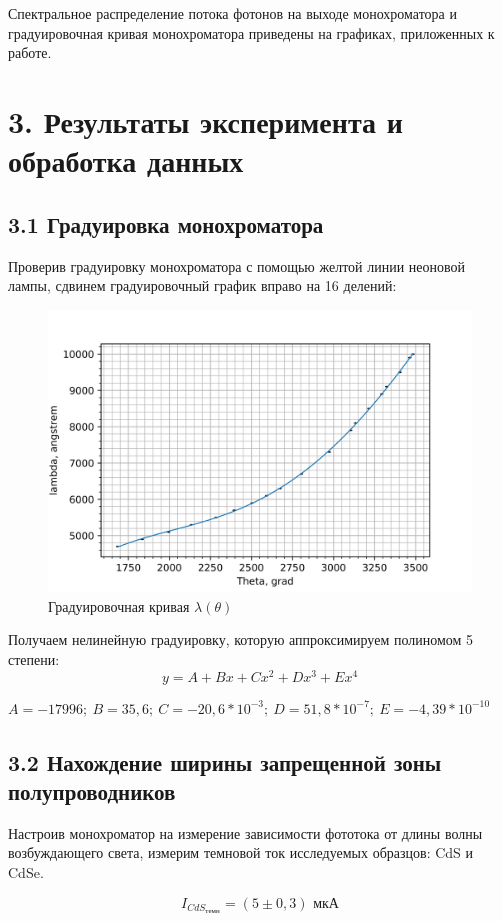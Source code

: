 \documentclass[a4paper,12pt]{report}
\begin{document}
Спектральное распределение потока фотонов на выходе монохроматора и градуировочная кривая монохроматора приведены на графиках, приложенных к работе.

\section*{3. Результаты эксперимента и обработка данных}
\subsection*{3.1 Градуировка монохроматора}
Проверив градуировку монохроматора с помощью желтой линии неоновой лампы, сдвинем градуировочный график вправо на 16 делений:


	\begin{figure}[H]
		\centering
		\includegraphics[width=0.7\linewidth]{grad.png}
		\caption{Градуировочная кривая $\lambda(\theta)$}
	\end{figure}
 
Получаем нелинейную градуировку, которую аппроксимируем полиномом 5 степени:
\begin{equation*}
    y = A + Bx + Cx^2 + Dx^3 + Ex^4
\end{equation*}
\begin{center}
$A = -17996; \ B = 35,6;\ C = -20,6 * 10^{-3};\ D = 51,8 * 10^{-7}; \ E = -4,39 * 10^{-10}$    
\end{center}
\subsection*{3.2 Нахождение ширины запрещенной зоны полупроводников}

Настроив монохроматор на измерение зависимости фототока от длины волны возбуждающего света, измерим темновой ток исследуемых образцов: CdS и CdSe.

\begin{equation*}
    I_{CdS_{\text{темн}}} = (5 \pm 0,3) \text{ мкА}
\end{equation*}
\end{document}

